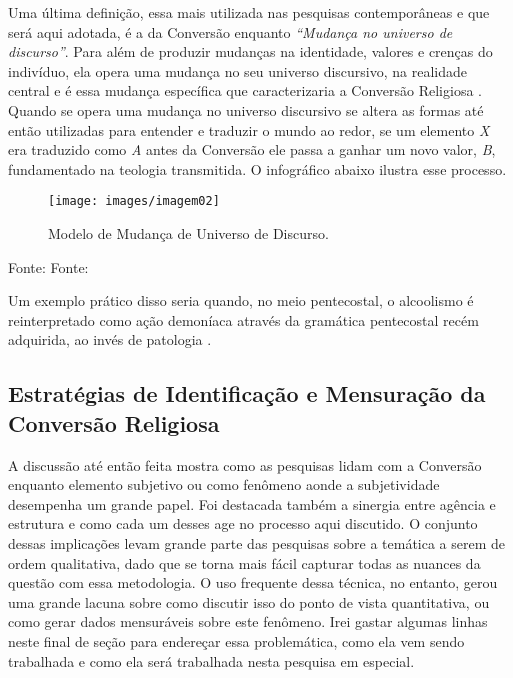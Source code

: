 \documentclass[
	12pt,				%
	oneside,			%
	a4paper,			%
	sumario=tradicional,
	english,			%
	brazil				%
	]{abntex2}
\newcommand{\bcenter}{\begin{center}}
\newcommand{\ecenter}{\end{center}}
\begin{document}
Uma última definição, essa mais utilizada nas pesquisas contemporâneas e que será aqui adotada, é a da Conversão enquanto \emph{``Mudança no universo de discurso''}. Para além de produzir mudanças na identidade, valores e crenças do indivíduo, ela opera uma mudança no seu universo discursivo, na realidade central e é essa mudança específica que caracterizaria a Conversão Religiosa \autocite[170]{snow_sociology_1984}. Quando se opera uma mudança no universo discursivo se altera as formas até então utilizadas para entender e traduzir o mundo ao redor, se um elemento \emph{X} era traduzido como \emph{A} antes da Conversão ele passa a ganhar um novo valor, \emph{B}, fundamentado na teologia transmitida. O infográfico abaixo ilustra esse processo.
\begin{figure}[H]

{\centering \texttt{[image: images/imagem02]} 

}

\caption{Modelo de Mudança de Universo de Discurso.}\label{fig:imagem3}
\end{figure}
\bcenter

Fonte: Fonte: \autocite{snow_sociology_1984}
\ecenter

Um exemplo prático disso seria quando, no meio pentecostal, o alcoolismo é reinterpretado como ação demoníaca através da gramática pentecostal recém adquirida, ao invés de patologia \autocite{mariz_libertacao_1994}.

\hypertarget{estratuxe9gias-de-identificauxe7uxe3o-e-mensurauxe7uxe3o-da-conversuxe3o-religiosa}{%
\subsection{Estratégias de Identificação e Mensuração da Conversão Religiosa}\label{estratuxe9gias-de-identificauxe7uxe3o-e-mensurauxe7uxe3o-da-conversuxe3o-religiosa}}

A discussão até então feita mostra como as pesquisas lidam com a Conversão enquanto elemento subjetivo ou como fenômeno aonde a subjetividade desempenha um grande papel. Foi destacada também a sinergia entre agência e estrutura e como cada um desses age no processo aqui discutido. O conjunto dessas implicações levam grande parte das pesquisas sobre a temática a serem de ordem qualitativa, dado que se torna mais fácil capturar todas as nuances da questão com essa metodologia. O uso frequente dessa técnica, no entanto, gerou uma grande lacuna sobre como discutir isso do ponto de vista quantitativa, ou como gerar dados mensuráveis sobre este fenômeno. Irei gastar algumas linhas neste final de seção para endereçar essa problemática, como ela vem sendo trabalhada e como ela será trabalhada nesta pesquisa em especial.
\end{document}
